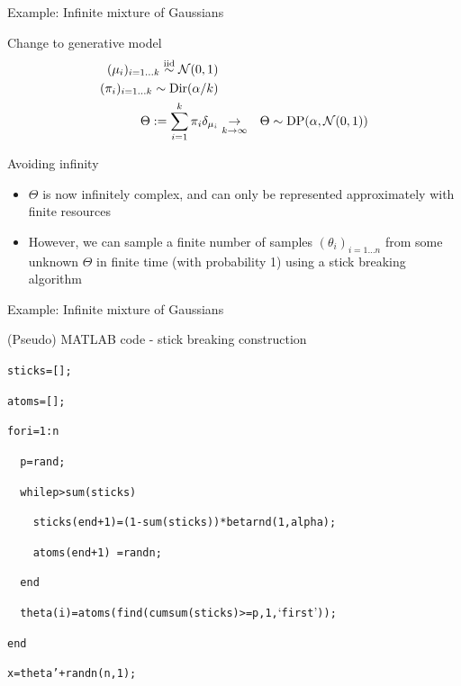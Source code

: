 \begin{frame}{Example: Infinite mixture of Gaussians}
  \begin{block}{Change to generative model}
    \begin{eqnarray*}
      (\mu_i)_{i=1\ldots k} \stackrel{\mathrm{iid}}{\sim} \mathcal{N}(0, 1) &\\
      (\pi_i)_{i=1\ldots k} \sim \textrm{Dir}(\alpha/k) & \\
      \Theta := \sum_{i=1}^k \pi_i \delta_{\mu_i} & \underset{k \to \infty}{\to} & \Theta \sim \textrm{DP}(\alpha, \mathcal{N}(0,1))
    \end{eqnarray*}
  \end{block}
  \begin{block}{Avoiding infinity}
    \vspace{0.5\baselineskip}
    \begin{itemize}
      \item $\Theta$ is now infinitely complex, and can only be represented approximately with finite resources
      \vspace{0.5\baselineskip}
      \item However, we can sample a finite number of samples $(\theta_i)_{i=1\ldots n}$ from some unknown $\Theta$ in finite time (with probability 1) using a stick breaking algorithm
    \end{itemize}
  \end{block}
\end{frame}  

\begin{frame}{Example: Infinite mixture of Gaussians}
  \begin{block}{(Pseudo) MATLAB code - stick breaking construction}
    \begin{alltt}
      sticks = [];
      
      atoms = [];
      
      
      for i = 1:n
      
      \ \ p = rand;
      
      \ \ while p > sum(sticks)
      
      \ \ \ \ sticks(end+1) = (1-sum(sticks)) * betarnd(1, alpha);
      
      \ \ \ \ atoms(end+1) \ = randn;
      
      \ \ end
      
      \ \ theta(i) = atoms(find(cumsum(sticks)>=p, 1, `first'));
      
      end
      
      
      x = theta' + randn(n, 1);
    \end{alltt}
  \end{block}
\end{frame}

